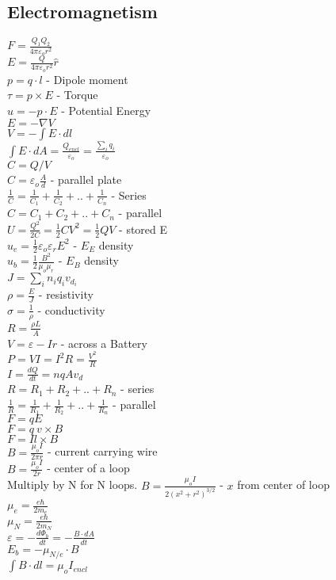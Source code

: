 \begin{multicols}{2}
    \chapter{Electromagnetism}
    $F=\frac{Q_1 Q_2}{4\pi \varepsilon_o r^2} $\\
    $E=\frac{Q}{4\pi \varepsilon_o r^2}\hat{r}$\\
    $p=q\cdot l$ - Dipole moment\\
    $\tau=p \times E$ - Torque\\
    $u=-p\cdot E $ - Potential Energy\\
    $E=-\nabla V$\\
    $V=-\int E \cdot dl $\\
    $\int E \cdot dA=\frac{Q_{encl}}{\varepsilon_o}=\frac{\sum_i q_i}{\varepsilon_o}$\\
    $C=Q/V$\\
    $C=\varepsilon_o \frac{A}{d} $ - parallel plate\\
    $\frac{1}{C}=\frac{1}{C_1}+\frac{1}{C_2}+..+\frac{1}{C_n}$ - Series\\
    $C=C_1+C_2+..+C_n$ - parallel\\
    $U=\frac{Q^2}{2C}=\frac{1}{2}CV^2=\frac{1}{2}QV$ - stored E\\
    $u_e=\frac{1}{2}\varepsilon_o \varepsilon_r E^2$ - $E_E$ density\\
    $u_b=\frac{1}{2}\frac{B^2}{\mu_o \mu_r}$ - $E_B$ density\\
    $J=\sum_i n_iq_iv_{d_i}$\\
    $\rho=\frac{E}{J}$ - resistivity\\
    $\sigma=\frac{1}{\rho}$ - conductivity\\
    $R=\frac{\rho L}{A}$\\
    $V=\varepsilon-Ir$ - across a Battery\\
    $P=VI=I^2R=\frac{V^2}{R}$\\
    $I=\frac{dQ}{dt}=nqAv_d$\\
    $R=R_1+R_2+..+R_n$ - series\\
    $\frac{1}{R}=\frac{1}{R_1}+\frac{1}{R_2}+..+\frac{1}{R_n}$ - parallel\\
    $F=qE$\\
    $F=q \ v\times B$\\
    $F=Il\times B$ \\
    $B=\frac{\mu_o I}{2\pi r}$ - current carrying wire\\
    $B=\frac{\mu_o I}{2r}$ - center of a loop\\
    Multiply by N for N loops.
    $B=\frac{\mu_o I}{2(x^2+r^2)^{3/2}}$ - $x$ from center of loop\\
    $\mu_e=\frac{e\hbar}{2m_e}$ \\
    $\mu_N=\frac{e\hbar}{2m_N}$\\
    $\varepsilon=-\frac{d\Phi_b}{dt}=-\frac{B\cdot dA}{dt}$\\
    $E_b=-\mu_{N / e} \cdot B$\\
    $\int B \cdot dl=\mu_o I_{encl}$\\


\end{multicols}
